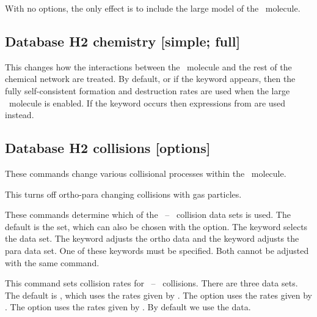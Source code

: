 With no options, the only effect is to include the large model of the
\htwo\ molecule.

\subsection{Database H2 chemistry [simple; full]}

This changes how the interactions between the \htwo\ molecule
and the rest of the chemical network are treated.
By default, or if the keyword
appears, then the fully self-consistent formation and destruction rates
are used when the large \htwo\ molecule is enabled.
If the keyword
 occurs
then expressions from \citet{Tielens1985a} are used instead.

\subsection{Database H2 collisions [options]}
\label{sec:CommandH2CollisionsOptions}

These commands change various collisional processes within
the \htwo\ molecule.


This turns off
ortho-para changing
collisions with gas particles.



These commands determine which of the \htwo\ -- \htwo\ collision data
sets is used.
The default is the \citet{LeeH2H22008} set, which can also
be chosen with the  option.
The keyword  selects the
\citet{LeBourlot1999} data set.
The keyword  adjusts the ortho data and the
keyword  adjusts the para data set.
One of these keywords must be specified.  Both cannot be adjusted
with the same command.


This command sets collision rates for \htwo\ -- \hO\ collisions.
There are three data sets.
The default is , which uses the rates given by \citet{Wrathmall2007}.
The  option uses the rates given by \citet{LeBourlot1999}.   
The  option uses the rates given by \citet{2015MNRAS.453..810L}.
By default we use the \citet{Wrathmall2007} data.

